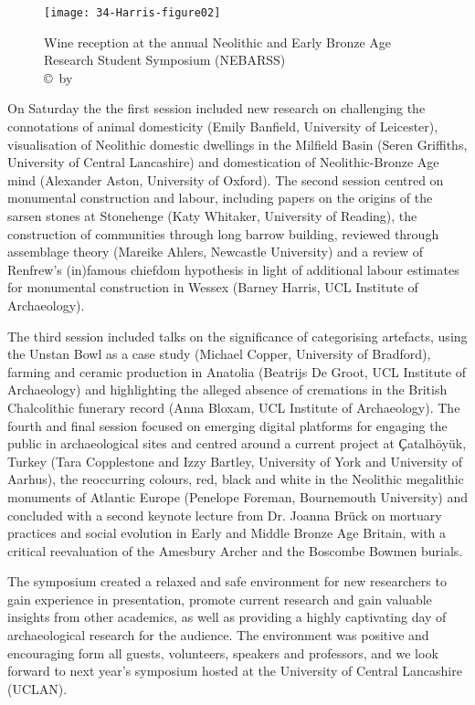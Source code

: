 
\begin{figure}[!htb]
	\texttt{[image: 34-Harris-figure02]}
	\caption{Wine reception at the  annual Neolithic and Early Bronze Age Research Student Symposium (NEBARSS)
		{\normalfont\scriptsize \\ \copyright\ by \shortauthor
	}}
	\label{fig:34-Harris-figure02}
\end{figure}


On Saturday the  the first session included new research on challenging the connotations of animal domesticity (Emily Banfield, University of Leicester), visualisation of Neolithic domestic dwellings in the Milfield Basin (Seren Griffiths, University of Central Lancashire) and domestication of Neolithic-Bronze Age mind (Alexander Aston, University of Oxford). The second session centred on monumental construction and labour, including papers on the origins of the sarsen stones at Stonehenge (Katy Whitaker, University of Reading), the construction of communities through long barrow building, reviewed through assemblage theory (Mareike Ahlers, Newcastle University) and a review of Renfrew’s (in)famous chiefdom hypothesis in light of additional labour estimates for  monumental construction in Wessex (Barney Harris, UCL Institute of Archaeology).

The third session included talks on the significance of categorising artefacts, using the Unstan Bowl as a case study (Michael Copper, University of Bradford), farming and ceramic production in Anatolia (Beatrijs De Groot, UCL Institute of Archaeology) and highlighting the alleged absence of cremations in the British Chalcolithic funerary record (Anna Bloxam, UCL Institute of Archaeology). The fourth and final session focused on emerging digital platforms for engaging the public in archaeological sites and centred around a current project at Ҫatalhöyük, Turkey (Tara Copplestone and Izzy Bartley, University of York and University of Aarhus), the reoccurring colours, red, black and white in the Neolithic megalithic monuments of Atlantic Europe (Penelope Foreman, Bournemouth University) and concluded with a second keynote lecture from Dr. Joanna Brück on mortuary practices and social evolution in Early and Middle Bronze Age Britain, with a critical reevaluation of the Amesbury Archer and the Boscombe Bowmen burials.

The symposium created a relaxed and safe environment for new researchers to gain experience in presentation, promote current research and gain valuable insights from other academics, as well as providing a highly captivating day of archaeological research for the audience. The environment was positive and encouraging form all guests, volunteers, speakers and professors, and we look forward to next year’s symposium hosted at the University of Central Lancashire (UCLAN).

\IJSRAclosing